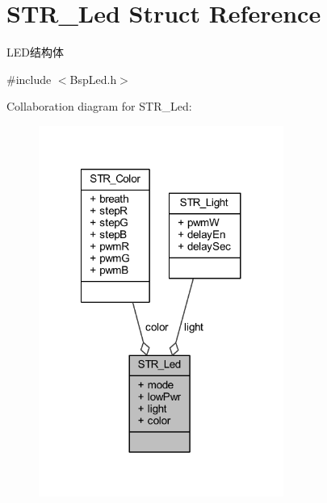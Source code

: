 \hypertarget{struct_s_t_r___led}{\section{\-S\-T\-R\-\_\-\-Led \-Struct \-Reference}
\label{struct_s_t_r___led}
}


\-L\-E\-D结构体  




{\ttfamily \#include $<$\-Bsp\-Led.\-h$>$}



\-Collaboration diagram for \-S\-T\-R\-\_\-\-Led\-:\nopagebreak
\begin{figure}[H]
\begin{center}
\leavevmode
\includegraphics[width=227pt]{struct_s_t_r___led__coll__graph}
\end{center}
\end{figure}
